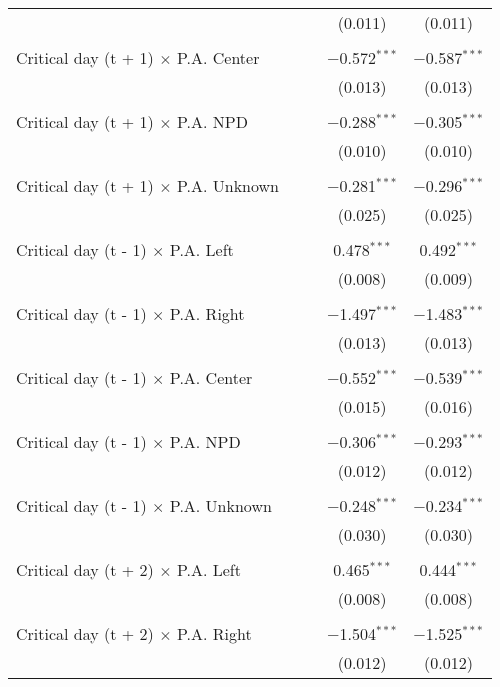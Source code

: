 \documentclass[
]{article}
\begin{document}
\begin{table}[!htbp]
{\begin{tabular}{@{\extracolsep{5pt}}lcccc}
  &  &  & (0.011) & (0.011) \\ 
  & & & & \\ 
 Critical day (t + 1) $\times$ P.A. Center &  &  & $-$0.572$^{***}$ & $-$0.587$^{***}$ \\ 
  &  &  & (0.013) & (0.013) \\ 
  & & & & \\ 
 Critical day (t + 1) $\times$ P.A. NPD &  &  & $-$0.288$^{***}$ & $-$0.305$^{***}$ \\ 
  &  &  & (0.010) & (0.010) \\ 
  & & & & \\ 
 Critical day (t + 1) $\times$ P.A. Unknown &  &  & $-$0.281$^{***}$ & $-$0.296$^{***}$ \\ 
  &  &  & (0.025) & (0.025) \\ 
  & & & & \\ 
 Critical day (t - 1) $\times$ P.A. Left &  &  & 0.478$^{***}$ & 0.492$^{***}$ \\ 
  &  &  & (0.008) & (0.009) \\ 
  & & & & \\ 
 Critical day (t - 1) $\times$ P.A. Right &  &  & $-$1.497$^{***}$ & $-$1.483$^{***}$ \\ 
  &  &  & (0.013) & (0.013) \\ 
  & & & & \\ 
 Critical day (t - 1) $\times$ P.A. Center &  &  & $-$0.552$^{***}$ & $-$0.539$^{***}$ \\ 
  &  &  & (0.015) & (0.016) \\ 
  & & & & \\ 
 Critical day (t - 1) $\times$ P.A. NPD &  &  & $-$0.306$^{***}$ & $-$0.293$^{***}$ \\ 
  &  &  & (0.012) & (0.012) \\ 
  & & & & \\ 
 Critical day (t - 1) $\times$ P.A. Unknown &  &  & $-$0.248$^{***}$ & $-$0.234$^{***}$ \\ 
  &  &  & (0.030) & (0.030) \\ 
  & & & & \\ 
 Critical day (t + 2) $\times$ P.A. Left &  &  & 0.465$^{***}$ & 0.444$^{***}$ \\ 
  &  &  & (0.008) & (0.008) \\ 
  & & & & \\ 
 Critical day (t + 2) $\times$ P.A. Right &  &  & $-$1.504$^{***}$ & $-$1.525$^{***}$ \\ 
  &  &  & (0.012) & (0.012) \\ 

\end{tabular}}
\end{table}
\end{document}

